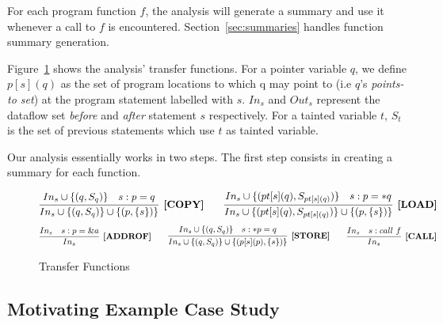 For each program function $f$,
the analysis will generate a summary and use it whenever
a call to $f$ is encountered.
Section~\ref{sec:summaries} handles function summary generation.

Figure~\ref{fig:rules} shows the analysis' transfer functions.
For a pointer variable $q$, we define \(p[s](q)\) as the set
of program locations to which q may point to (i.e $q$'s \textit{points-to set})
at the program statement labelled with $s$.
$In_s$ and $Out_s$ represent the dataflow set \textit{before}
and \textit{after} statement $s$ respectively. 
For a tainted variable $t$, $S_t$ is the set of previous
statements which use $t$ as tainted variable.

\begin{comment}
\begin{table}[h!]
\begin{center}
\begin{tabular}{c|l}
Symbols & Description 	\\ \hline
\(In_s \)			& Dataflow set before statement $s$		\\	\hline
\(Out_s \)			& Dataflow set after statement $s$		\\  \hline
\(S_v \)			& Set of statements that use tainted variable $v$		\\
\end{tabular}
\caption{Symbol Description}
\end{center}
\end{table}
\end{comment}

Our analysis essentially works in two steps. The
first step consists in creating a summary for each
function.

\begin{figure}[!h]
\[
\infer[\COPY]
  {In_s \cup \set{(q, S_q)} \cup \set{(p, \set{s})}}
  {In_s \cup \set{(q, S_q)} & s:p = q}
\qquad
\infer[\LOAD]
  {In_s \cup \set{(pt[s](q), S_{pt[s](q)})} \cup \set{(p, \set{s})}}
  {In_s \cup \set{(pt[s](q), S_{pt[s](q)})}   & s:p = *q}
\]
\[
\infer[\ADDROF]
  {In_s }
  {In_s & s:p = \&a}
\qquad  
\infer[\STORE]
  {In_s \cup \set{(q, S_q)} \cup \set{(p[s](p), \set{s})} }
  {In_s \cup \set{(q, S_q)} & s:*p = q}
\qquad
\infer[\CALL]
  {In_s}
  {In_s & s:call\ f}  
\]
\caption{Transfer Functions}
\label{fig:rules}
\end{figure}

\subsection{Motivating Example Case Study}\label{sec:sampleSummary}

